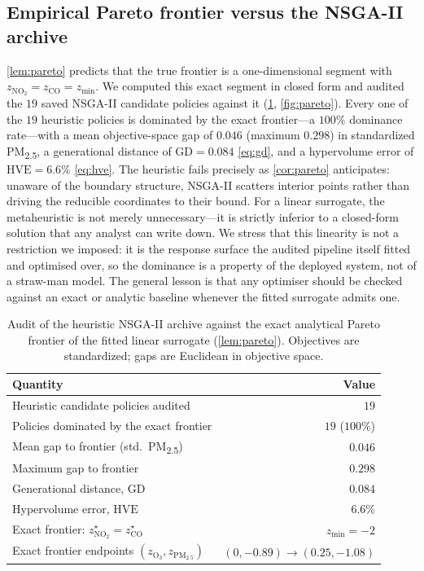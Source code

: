 \subsection{Empirical Pareto frontier versus the NSGA-II archive}
\cref{lem:pareto} predicts that the true frontier is a one-dimensional segment with
$z_{\mathrm{NO_2}}=z_{\mathrm{CO}}=z_{\min}$. We computed this exact segment in closed
form and audited the $19$ saved NSGA-II candidate policies against it
(\cref{tab:pareto}, \cref{fig:pareto}). Every one of the $19$ heuristic policies is
dominated by the exact frontier---a $100\%$ dominance rate---with a mean objective-space
gap of $0.046$ (maximum $0.298$) in standardized PM\textsubscript{2.5}, a generational
distance of $\mathrm{GD}=0.084$ \eqref{eq:gd}, and a hypervolume error of
$\mathrm{HVE}=6.6\%$ \eqref{eq:hve}. The heuristic fails precisely as
\cref{cor:pareto} anticipates: unaware of the boundary structure, NSGA-II scatters
interior points rather than driving the reducible coordinates to their bound. For a
linear surrogate, the metaheuristic is not merely unnecessary---it is strictly inferior
to a closed-form solution that any analyst can write down. We stress that this linearity
is not a restriction we imposed: it is the response surface the audited pipeline itself
fitted and optimised over, so the dominance is a property of the deployed system, not of
a straw-man model. The general lesson is that any optimiser should be checked against an
exact or analytic baseline whenever the fitted surrogate admits one.

\begin{table}[t]
  \centering
  \caption{Audit of the heuristic NSGA-II archive against the exact analytical Pareto
  frontier of the fitted linear surrogate (\cref{lem:pareto}). Objectives are
  standardized; gaps are Euclidean in objective space.}
  \label{tab:pareto}
  \begin{tabular}{lr}
    \toprule
    Quantity & Value \\
    \midrule
    Heuristic candidate policies audited          & $19$ \\
    Policies dominated by the exact frontier       & $19$ ($100\%$) \\
    Mean gap to frontier (std.\ PM\textsubscript{2.5}) & $0.046$ \\
    Maximum gap to frontier                        & $0.298$ \\
    Generational distance, $\mathrm{GD}$           & $0.084$ \\
    Hypervolume error, $\mathrm{HVE}$              & $6.6\%$ \\
    Exact frontier: $z_{\mathrm{NO_2}}^\star=z_{\mathrm{CO}}^\star$ & $z_{\min}=-2$ \\
    Exact frontier endpoints $(z_{\mathrm{O_3}},z_{\mathrm{PM_{2.5}}})$
      & $(0,-0.89)\to(0.25,-1.08)$ \\
    \bottomrule
  \end{tabular}
\end{table}

